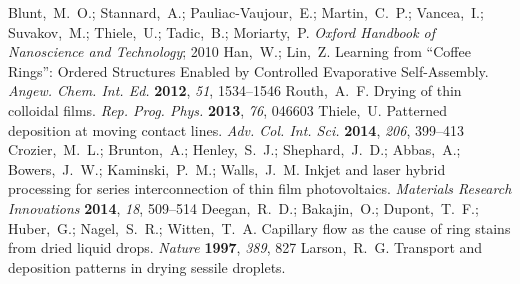 \documentclass[journal=langd5,manuscript=article]{achemso}
\begin{document}
\begin{mcitethebibliography}{71}
Blunt,~M.~O.; Stannard,~A.; Pauliac-Vaujour,~E.; Martin,~C.~P.; Vancea,~I.;
  Suvakov,~M.; Thiele,~U.; Tadic,~B.; Moriarty,~P. \emph{Oxford Handbook of
  Nanoscience and Technology}; 2010\relax
\mciteBstWouldAddEndPuncttrue
\mciteSetBstMidEndSepPunct{\mcitedefaultmidpunct}
{\mcitedefaultendpunct}{\mcitedefaultseppunct}\relax
\EndOfBibitem
{}
Han,~W.; Lin,~Z. Learning from ``Coffee Rings'': Ordered Structures Enabled by
  Controlled Evaporative Self-Assembly. \emph{Angew. Chem. Int. Ed.}
  \textbf{2012}, \emph{51}, 1534--1546\relax
\mciteBstWouldAddEndPuncttrue
\mciteSetBstMidEndSepPunct{\mcitedefaultmidpunct}
{\mcitedefaultendpunct}{\mcitedefaultseppunct}\relax
\EndOfBibitem
{}
Routh,~A.~F. Drying of thin colloidal films. \emph{Rep. Prog. Phys.}
  \textbf{2013}, \emph{76}, 046603\relax
\mciteBstWouldAddEndPuncttrue
\mciteSetBstMidEndSepPunct{\mcitedefaultmidpunct}
{\mcitedefaultendpunct}{\mcitedefaultseppunct}\relax
\EndOfBibitem
{}
Thiele,~U. Patterned deposition at moving contact lines. \emph{Adv. Col. Int.
  Sci.} \textbf{2014}, \emph{206}, 399--413\relax
\mciteBstWouldAddEndPuncttrue
\mciteSetBstMidEndSepPunct{\mcitedefaultmidpunct}
{\mcitedefaultendpunct}{\mcitedefaultseppunct}\relax
\EndOfBibitem
{}
Crozier,~M.~L.; Brunton,~A.; Henley,~S.~J.; Shephard,~J.~D.; Abbas,~A.;
  Bowers,~J.~W.; Kaminski,~P.~M.; Walls,~J.~M. Inkjet and laser hybrid
  processing for series interconnection of thin film photovoltaics.
  \emph{Materials Research Innovations} \textbf{2014}, \emph{18},
  509--514\relax
\mciteBstWouldAddEndPuncttrue
\mciteSetBstMidEndSepPunct{\mcitedefaultmidpunct}
{\mcitedefaultendpunct}{\mcitedefaultseppunct}\relax
\EndOfBibitem
{}
Deegan,~R.~D.; Bakajin,~O.; Dupont,~T.~F.; Huber,~G.; Nagel,~S.~R.;
  Witten,~T.~A. Capillary flow as the cause of ring stains from dried liquid
  drops. \emph{Nature} \textbf{1997}, \emph{389}, 827\relax
\mciteBstWouldAddEndPuncttrue
\mciteSetBstMidEndSepPunct{\mcitedefaultmidpunct}
{\mcitedefaultendpunct}{\mcitedefaultseppunct}\relax
\EndOfBibitem
{}
Larson,~R.~G. Transport and deposition patterns in drying sessile droplets.

\end{mcitethebibliography}
\end{document}

